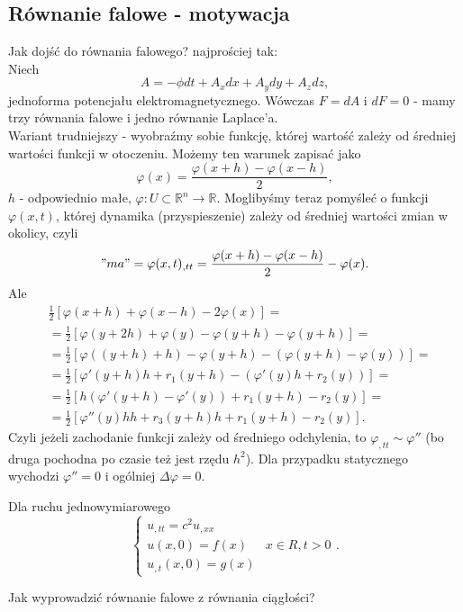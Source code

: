 \documentclass[../main.tex]{subfiles}
\begin{document}
\subsection{Równanie falowe - motywacja}
Jak dojść do równania falowego? najprościej tak:\\
Niech
\[
A = -\phi dt + A_x dx + A_ydy + A_zdz
,\]
jednoforma potencjału elektromagnetycznego. Wówczas $F = dA$ i $dF = 0$ - mamy trzy równania falowe i jedno równanie Laplace'a.\\
Wariant trudniejszy - wyobraźmy sobie funkcję, której wartość zależy od średniej wartości funkcji w otoczeniu. Możemy ten warunek zapisać jako
\[
		\varphi(x) = \frac{\varphi(x+h) - \varphi(x-h)}{2}
,\]
$h$ - odpowiednio małe, $\varphi: U\subset\mathbb{R}^n\to \mathbb{R}$. Moglibyśmy teraz pomyśleć o funkcji $\varphi(x,t)$, której dynamika (przyspieszenie) zależy od średniej wartości zmian w okolicy, czyli
\[
		"ma" = \varphi(x,t)_{,t t} = \frac{\varphi(x+h) - \varphi(x-h)}{2} - \varphi(x)
.\]
Ale
\begin{align*}
		& \frac{1}{2}\left[ \varphi(x+h) + \varphi(x-h) - 2\varphi(x) \right] = \\
		&= \frac{1}{2}\left[ \varphi(y+2h) + \varphi(y) - \varphi(y+h) - \varphi(y+h) \right] = \\
		&= \frac{1}{2}\left[ \varphi((y+h)+h) - \varphi(y+h) - \left( \varphi(y+h) - \varphi(y) \right)  \right] = \\
		&= \frac{1}{2}\left[ \varphi'(y+h) h + r_1(y+h) - \left( \varphi'(y)h + r_2(y) \right)  \right] = \\
		&= \frac{1}{2}\left[ h \left( \varphi'(y+h) - \varphi'(y) \right) + r_1(y+h) - r_2(y) \right] = \\
		&= \frac{1}{2}\left[ \varphi''(y)hh + r_3(y+h)h + r_1(y+h) - r_2(y) \right]
.\end{align*}
Czyli jeżeli zachodanie funkcji zależy od średniego odchylenia, to
$\varphi_{,t t}\sim \varphi''$ (bo druga pochodna po czasie też jest rzędu $h^2$). Dla przypadku statycznego wychodzi $\varphi'' = 0$ i ogólniej $\Delta \varphi = 0$.
\begin{przyklad}
		Dla ruchu jednowymiarowego
		\[
		\begin{cases}
				u_{,t t} = c^2 u_{,x x} & \\
				u(x,0) = f(x) & x\in R, t>0\\
				u_{,t}(x,0)  = g(x)
		\end{cases}
		.\]
\end{przyklad}
\begin{pytanie}
		Jak wyprowadzić równanie falowe z równania ciągłości?
\end{pytanie}
\end{document}
